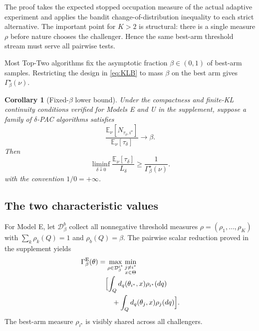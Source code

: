 \documentclass[twoside]{article}
\newtheorem{corollary}[theorem]{Corollary}
\theoremstyle{definition}
\newcommand{\E}{\mathbb E}
\newcommand{\1}{\mathbf 1}
\newcommand{\GammaE}{\Gamma_{\beta}^{\mathrm E}}
\newcommand{\Ldelta}{L_\delta}
\begin{document}
The proof takes the expected stopped occupation measure of the actual adaptive experiment and applies the bandit change-of-distribution inequality to each strict alternative.  The important point for $K>2$ is structural: there is a single measure $\rho$ before nature chooses the challenger.  Hence the same best-arm threshold stream must serve all pairwise tests.

Most Top-Two algorithms fix the asymptotic fraction $\beta\in(0,1)$ of best-arm samples.  Restricting the design in \eqref{eq:KLB} to mass $\beta$ on the best arm gives $\Gamma_\beta^\star(\nu)$.

\begin{corollary}[Fixed-$\beta$ lower bound]
\label{cor:betaLB}
Under the compactness and finite-KL continuity conditions verified for Models E and U in the supplement, suppose a family of $\delta$-PAC algorithms satisfies
\[
\frac{\E_\nu[N_{\tau_\delta,i^\star}]}{\E_\nu[\tau_\delta]}\longrightarrow\beta.
\]
Then
\begin{equation}
\liminf_{\delta\downarrow0}
\frac{\E_\nu[\tau_\delta]}{\Ldelta}
\ge \frac1{\Gamma_\beta^\star(\nu)}.
\label{eq:betaLB}
\end{equation}
with the convention $1/0=+\infty$.
\end{corollary}

\subsection{The two characteristic values}
For Model E, let $\mathcal D_\beta^b$ collect all nonnegative threshold
measures $\rho=(\rho_1,\ldots,\rho_K)$ with
$\sum_k\rho_k(Q)=1$ and $\rho_b(Q)=\beta$.
The pairwise scalar reduction proved in the supplement yields
\begin{equation}
\begin{aligned}
\GammaE(\theta)
&=\max_{\rho\in\mathcal D_\beta^{i^\star}}
\min_{\substack{j\ne i^\star\\x\in\Theta}}\\[-2pt]
&\quad\Bigl[\int_Qd_q(\theta_{i^\star},x)\rho_{i^\star}(dq)\\[-1pt]
&\qquad+\int_Qd_q(\theta_j,x)\rho_j(dq)\Bigr].
\end{aligned}
\label{eq:GammaE-main}
\end{equation}
The best-arm measure $\rho_{i^\star}$ is visibly shared across all challengers.
\end{document}
